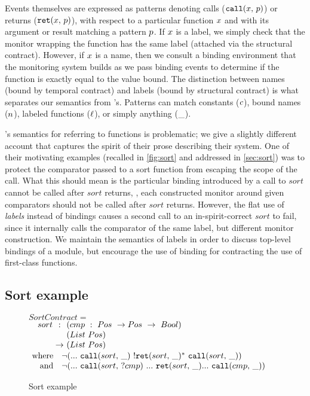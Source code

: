 \documentclass[preprint,onecolumn,9pt]{sigplanconf} %
\begin{document}
Events themselves are expressed as patterns denoting calls (${\tt call}(x,\, p)$) or returns (${\tt ret}(x,\, p)$), with respect to a particular function $x$ and with its argument or result matching a pattern $p$.
%
If $x$ is a label, we simply check that the monitor wrapping the function has the same label (attached via the structural contract).
%
However, if $x$ is a name, then we consult a binding environment that the monitoring system builds as we pass binding events to determine if the function is exactly equal to the value bound.
%
The distinction between names (bound by temporal contract) and labels (bound by structural contract) is what separates our semantics from \citeauthor{ianjohnson:dfm:icfp2011}'s.
%
Patterns can match constants ($c$), bound names ($n$), labeled functions ($\ell$), or simply anything ($\_$).

\citeauthor{ianjohnson:dfm:icfp2011}'s semantics for referring to functions is problematic; we give a slightly different account that captures the spirit of their prose describing their system.
%
One of their motivating examples (recalled in \autoref{fig:sort} and addressed in \autoref{sec:sort}) was to protect the comparator passed to a sort function from escaping the scope of the call.
%
What this should mean is the particular binding introduced by a call to $sort$ cannot be called after $sort$ returns, \ie, each constructed monitor around given comparators should not be called after $sort$ returns.
%
However, the flat use of \emph{labels} instead of bindings causes a second call to an in-spirit-correct $sort$ to fail, since it internally calls the comparator of the same label, but different monitor construction.
%
We maintain the semantics of labels in order to discuss top-level bindings of a module, but encourage the use of binding for contracting the use of first-class functions.

\subsection{Sort example} \label{sec:sort}

\renewcommand*{\arraystretch}{1.2}
\newcommand*{\call}[1]{\scallev{#1}{\_}}
\newcommand*{\ret}[1]{\sretev{#1}{\_}}
\begin{figure}
 $SortContract = $ \\
 $\begin{array}{ @{\quad}l@{\ } c @{\ }l }
 sort &:   &(cmp\ :\ Pos\ \to Pos\ \to\ Bool) \\
      &    &(List\ Pos) \\
      &\to &(List\ Pos) \\
 \end{array}$
 $\begin{array}{ @{~}r@{} l @{}l }
  \text{where}\quad
  &\stnot{(&\sddd~ \call{sort}~ \stmany{\snonevent{\ret{sort}}}~ \call{sort})} \\
  \text{and}\quad
  &\stnot{(&\sddd~ \scallev{sort}{?cmp}~ \sddd~ \ret{sort} \sddd~ \call{cmp})}
 \end{array}$
 \caption{Sort example}
 \label{fig:sort}
\end{figure}
\end{document}
